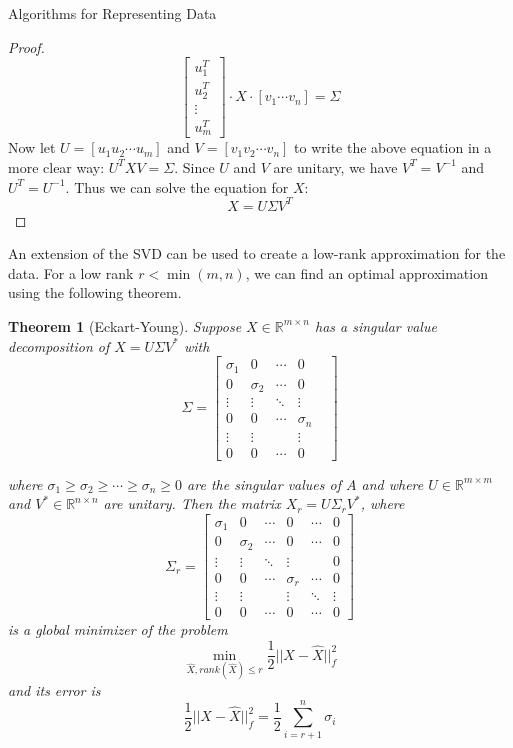 \documentclass[12pt]{pom_thesis}
\newtheorem{theorem}{Theorem}
\begin{document}
\begin{chapter}{Algorithms for Representing Data}
\begin{proof}
	 	 $$\begin{bmatrix}
	 	 u_1^T \\
	 	 u_2^T        \\
	 	 \vdots      \\
	 	 u_m^T 
	 	 \end{bmatrix} \cdot X \cdot [v_1 \cdots v_n] =  \Sigma$$
	 	 Now let $U= [u_1 u_2 \cdots u_m]$ and $V=[v_1 v_2 \cdots v_n]$ to write the above equation in a more clear way: $U^TXV=\Sigma$. Since $U$ and $V$ are unitary, we have $V^T=V^{-1}$ and $U^T=U^{-1}$. Thus we can solve the equation for $X$:
	 	 $$X = U \Sigma V^T$$
\end{proof}
An extension of the SVD can be used to create a low-rank approximation for the data. For a low rank $r < \min(m,n)$, we can find an optimal approximation using the following theorem.
\begin{theorem}[Eckart-Young]
	Suppose  $X \in \mathbb{R}^{m \times n}$ has a singular value decomposition of $X= U \Sigma V^*$ with $$\Sigma = \begin{bmatrix}
	\sigma_1  & 0     & \cdots             & 0    \\
	0  & \sigma_2 & \cdots & 0        \\
	\vdots  & \vdots & \ddots & \vdots &     \\
	0 & 0 & \cdots & \sigma_n   \\
	\vdots  &     \vdots    && \vdots \\
	0 & 0      &      \cdots  &0      
	\end{bmatrix}$$

	where $\sigma_1 \geq \sigma_2 \geq \cdots \geq \sigma_n \geq 0$ are the singular values of $A$ and where  $U \in \mathbb{R}^{m \times m}$  and $V^* \in \mathbb{R}^{n \times n}$ are unitary. Then the matrix $X_r = U\Sigma_rV^*$, where 
	$$\Sigma_r = \begin{bmatrix}
	\sigma_1  & 0     & \cdots      &0       &   \cdots & 0   \\
	0  & \sigma_2 & \cdots & 0    &  \cdots & 0    \\
	\vdots  & \vdots & \ddots & \vdots &  & 0   \\
	0 & 0 & \cdots & \sigma_r  & \cdots & 0  \\
	\vdots  &     \vdots    && \vdots & \ddots & \vdots  \\
	0 & 0      &      \cdots  &0      & \cdots & 0 
	\end{bmatrix}$$
	is a global minimizer of the problem 
	$$\min_{\hat{X}, rank(\hat{X}) \leq r} \frac{1}{2} ||X-\hat{X}||^2_f$$
	and its error is 	$$\frac{1}{2} ||X-\hat{X}||^2_f = \frac{1}{2}\sum_{i=r+1}^n \sigma_i$$


\end{theorem}
\end{chapter}
\end{document}
